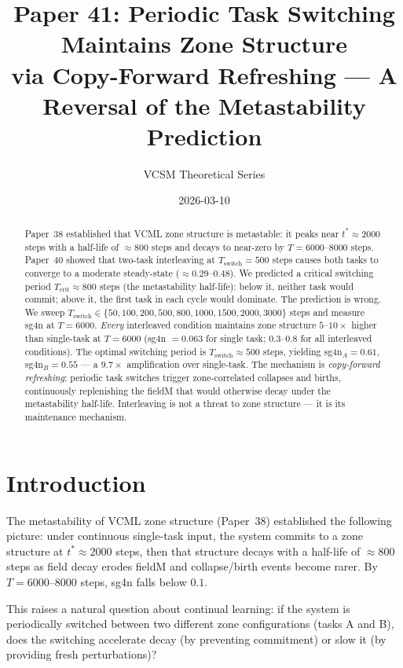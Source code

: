 \documentclass[11pt]{article}
\title{\textbf{Paper 41: Periodic Task Switching Maintains Zone Structure\\
via Copy-Forward Refreshing --- A Reversal of the Metastability Prediction}}
\author{VCSM Theoretical Series}
\date{2026-03-10}
\begin{document}
\maketitle

\begin{abstract}
Paper~38 established that VCML zone structure is metastable: it peaks near
$t^* \approx 2000$ steps with a half-life of $\approx 800$ steps and decays to
near-zero by $T = 6000$--$8000$ steps.
Paper~40 showed that two-task interleaving at $T_\mathrm{switch} = 500$ steps
causes both tasks to converge to a moderate steady-state ($\approx 0.29$--$0.48$).
We predicted a critical switching period $T_\mathrm{crit} \approx 800$ steps
(the metastability half-life): below it, neither task would commit; above it,
the first task in each cycle would dominate.
The prediction is wrong.
We sweep $T_\mathrm{switch} \in \{50, 100, 200, 500, 800, 1000, 1500, 2000, 3000\}$
steps and measure sg4n at $T = 6000$.
\emph{Every} interleaved condition maintains zone structure $5$--$10\times$
higher than single-task at $T = 6000$ (sg4n $= 0.063$ for single task;
$0.3$--$0.8$ for all interleaved conditions).
The optimal switching period is $T_\mathrm{switch} \approx 500$ steps, yielding
sg4n$_A = 0.61$, sg4n$_B = 0.55$ --- a $9.7\times$ amplification over single-task.
The mechanism is \emph{copy-forward refreshing}: periodic task switches trigger
zone-correlated collapses and births, continuously replenishing the fieldM that
would otherwise decay under the metastability half-life.
Interleaving is not a threat to zone structure --- it is its maintenance mechanism.
\end{abstract}

\section{Introduction}

The metastability of VCML zone structure (Paper~38) established the following picture:
under continuous single-task input, the system commits to a zone structure at $t^*
\approx 2000$ steps, then that structure decays with a half-life of $\approx 800$
steps as field decay erodes fieldM and collapse/birth events become rarer.
By $T = 6000$--$8000$ steps, sg4n falls below $0.1$.

This raises a natural question about continual learning: if the system is periodically
switched between two different zone configurations (tasks A and B), does the switching
accelerate decay (by preventing commitment) or slow it (by providing fresh perturbations)?
\end{document}
